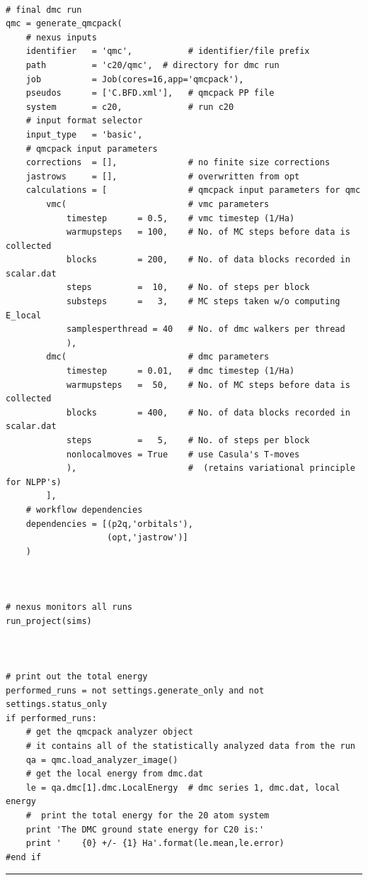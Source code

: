 \documentclass[oneside,11pt]{memoir}
\numberwithin{equation}{section}
\newcommand{\HRule}{\rule{\linewidth}{0.5mm}}
\begin{document}
\begin{verbatim}
    
# final dmc run
qmc = generate_qmcpack( 
    # nexus inputs
    identifier   = 'qmc',           # identifier/file prefix       
    path         = 'c20/qmc',  # directory for dmc run       
    job          = Job(cores=16,app='qmcpack'),
    pseudos      = ['C.BFD.xml'],   # qmcpack PP file
    system       = c20,             # run c20
    # input format selector                                      
    input_type   = 'basic',
    # qmcpack input parameters
    corrections  = [],              # no finite size corrections
    jastrows     = [],              # overwritten from opt
    calculations = [                # qmcpack input parameters for qmc
        vmc(                        # vmc parameters 
            timestep      = 0.5,    # vmc timestep (1/Ha)
            warmupsteps   = 100,    # No. of MC steps before data is collected
            blocks        = 200,    # No. of data blocks recorded in scalar.dat
            steps         =  10,    # No. of steps per block
            substeps      =   3,    # MC steps taken w/o computing E_local
            samplesperthread = 40   # No. of dmc walkers per thread
            ),                      
        dmc(                        # dmc parameters
            timestep      = 0.01,   # dmc timestep (1/Ha)
            warmupsteps   =  50,    # No. of MC steps before data is collected
            blocks        = 400,    # No. of data blocks recorded in scalar.dat
            steps         =   5,    # No. of steps per block
            nonlocalmoves = True    # use Casula's T-moves
            ),                      #  (retains variational principle for NLPP's)
        ],
    # workflow dependencies
    dependencies = [(p2q,'orbitals'),
                    (opt,'jastrow')]
    )



# nexus monitors all runs
run_project(sims)



# print out the total energy
performed_runs = not settings.generate_only and not settings.status_only
if performed_runs:
    # get the qmcpack analyzer object
    # it contains all of the statistically analyzed data from the run
    qa = qmc.load_analyzer_image()
    # get the local energy from dmc.dat
    le = qa.dmc[1].dmc.LocalEnergy  # dmc series 1, dmc.dat, local energy
    #  print the total energy for the 20 atom system
    print 'The DMC ground state energy for C20 is:'
    print '    {0} +/- {1} Ha'.format(le.mean,le.error)
#end if
\end{verbatim}
\HRule
\end{document}
